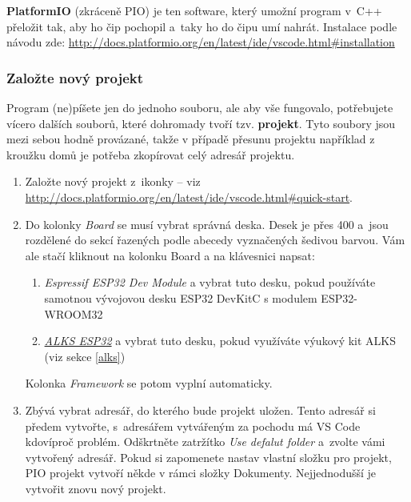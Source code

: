   \textbf{PlatformIO} (zkráceně PIO) je ten software, který umožní program v~C++ 
 přeložit tak, aby ho čip pochopil a~taky ho do čipu umí nahrát. 
 Instalace podle návodu zde: \url{http://docs.platformio.org/en/latest/ide/vscode.html#installation}
 
 \label{vsc:newproject} \subsubsection{Založte nový projekt}
 
 Program (ne)píšete jen do jednoho souboru, ale aby vše fungovalo, potřebujete vícero dalších souborů, které dohromady tvoří tzv. {\bf projekt}.
 Tyto soubory jsou mezi sebou hodně provázané, takže v případě přesunu projektu například z kroužku domů je potřeba zkopírovat celý adresář projektu. 

 
 
 
 \begin{enumerate}
 	\item Založte nový projekt z~ikonky  -- viz \url{http://docs.platformio.org/en/latest/ide/vscode.html#quick-start}.
 	\item Do kolonky {\it Board} se musí vybrat správná deska.
 		Desek je přes 400 a~jsou rozdělené do sekcí řazených podle abecedy vyznačených šedivou barvou.
 		Vám ale stačí kliknout na kolonku Board a na klávesnici napsat:
 		\begin{enumerate}
 			\item {\it Espressif ESP32 Dev Module} a vybrat tuto desku, pokud používáte samotnou vývojovou desku ESP32 DevKitC s modulem ESP32-WROOM32
 			\item {\it \href{https://docs.platformio.org/en/latest/boards/espressif32/alksesp32.html}{ALKS ESP32}} a vybrat tuto desku, pokud využíváte výukový kit ALKS (viz sekce \ref{alks}) 
 		\end{enumerate}
 	Kolonka {\it Framework } se potom vyplní automaticky. 
 	\item  Zbývá vybrat adresář, do kterého bude projekt uložen.
 	Tento adresář si předem vytvořte, s~adresářem vytvářeným za pochodu má VS Code kdovíproč problém.
 	Odškrtněte zatržítko {\it Use defalut folder} a~zvolte vámi vytvořený adresář. Pokud si zapomenete nastav vlastní složku pro projekt, PIO projekt vytvoří někde v rámci složky Dokumenty. Nejjednodušší je vytvořit znovu nový projekt.
 \end{enumerate}
 
